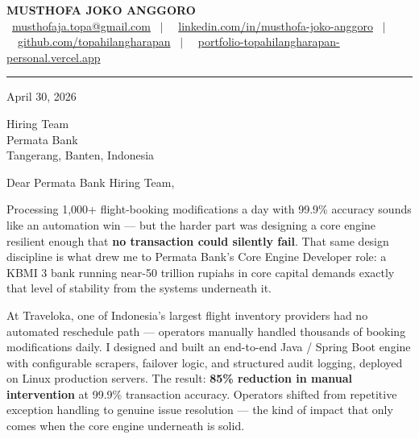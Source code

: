 \documentclass[11pt,a4paper]{article}
\begin{document}
\begin{center}
    {\LARGE \textbf{MUSTHOFA JOKO ANGGORO}} \\[4pt]
    \small
    \faEnvelope\ \href{mailto:musthofaja.topa@gmail.com}{musthofaja.topa@gmail.com}
    \ $|$ \
    \faLinkedin\ \href{https://www.linkedin.com/in/musthofa-joko-anggoro/}{linkedin.com/in/musthofa-joko-anggoro}
    \ $|$ \
    \faGithub\ \href{https://github.com/topahilangharapan}{github.com/topahilangharapan}
    \ $|$ \
    \faGlobe\ \href{https://portfolio-topahilangharapan-personal.vercel.app/}{portfolio-topahilangharapan-personal.vercel.app}
\end{center}

\vspace{4pt}\hrule\vspace{14pt}

April 30, 2026

\vspace{6pt}
Hiring Team \\
Permata Bank \\
Tangerang, Banten, Indonesia

\vspace{6pt}
Dear Permata Bank Hiring Team,

Processing 1,000+ flight-booking modifications a day with 99.9\% accuracy sounds like
an automation win --- but the harder part was designing a core engine resilient enough
that \textbf{no transaction could silently fail}. That same design discipline is what drew me
to Permata Bank's Core Engine Developer role: a KBMI 3 bank running near-50 trillion
rupiahs in core capital demands exactly that level of stability from the systems underneath it.

At Traveloka, one of Indonesia's largest flight inventory providers had no automated
reschedule path --- operators manually handled thousands of booking modifications daily.
I designed and built an end-to-end Java / Spring Boot engine with configurable scrapers,
failover logic, and structured audit logging, deployed on Linux production servers.
The result: \textbf{85\% reduction in manual intervention} at 99.9\% transaction accuracy.
Operators shifted from repetitive exception handling to genuine issue resolution --- the
kind of impact that only comes when the core engine underneath is solid.
\end{document}
